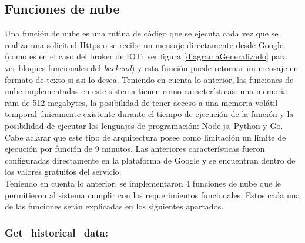 \subsection{Funciones de nube}
Una función de nube es una rutina de código que se ejecuta cada vez que se realiza una solicitud Https o se recibe un mensaje directamente desde Google (como es en el caso del broker de IOT; ver figura \ref{diagramaGeneralizado} para ver bloques funcionales del \textit{backend}) y esta función puede retornar un mensaje en formato de texto si asi lo desea.
Teniendo en cuenta lo anterior, las funciones de nube implementadas en este sistema tienen como características: una memoria ram de 512 megabytes, la posibilidad de tener acceso a una memoria volátil temporal únicamente existente durante el tiempo de ejecución de la función y la posibilidad de ejecutar los lenguajes de programación: Node.js, Python y Go. Cabe aclarar que este tipo de arquitectura posee como limitación un límite de ejecución por función de 9 minutos. Las anteriores características fueron configuradas directamente en la plataforma de Google y se encuentran dentro de los valores gratuitos del servicio.
\vspace{0.5cm}\\
Teniendo en cuenta lo anterior, se implementaron 4 funciones de nube que le permitieron al sistema cumplir con los requerimientos funcionales. Estos cada una de las funciones serán explicadas en los siguientes apartados.

\subsubsection{Get\_historical\_data:}


